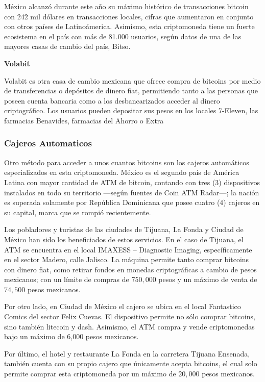 \documentclass[12pt,letterpaper]{article}
\begin{document}
M\'exico alcanz\'o durante este año su m\'aximo hist\'orico de transacciones bitcoin con 242 mil d\'olares en transacciones locales, cifras que aumentaron en conjunto con otros pa\'ises de Latino\'america. Asimismo, esta criptomoneda tiene un fuerte ecosistema en el pa\'is con m\'as de 81.000 usuarios, seg\'un datos de una de las mayores casas de cambio del pa\'is, Bitso.

\textbf{Volabit}

Volabit es otra casa de cambio mexicana que ofrece compra de bitcoins por medio de transferencias o dep\'ositos de dinero fiat, permitiendo tanto a las personas que poseen cuenta bancaria como a los desbancarizados acceder al dinero criptogr\'afico. Los usuarios pueden depositar sus pesos en los locales 7-Eleven, las farmacias Benavides, farmacias del Ahorro o Extra
\subsubsection*{Cajeros Automaticos}
Otro m\'etodo para acceder a unos cuantos bitcoins son los cajeros autom\'aticos especializados en esta criptomoneda. M\'exico es el segundo pa\'is de Am\'erica Latina con mayor cantidad de ATM de bitcoin, contando con tres (3) dispositivos instalados en todo su territorio —seg\'un fuentes de Coin ATM Radar—; la naci\'on es superada solamente por Rep\'ublica Dominicana que posee cuatro (4) cajeros en su capital, marca que se rompi\'o recientemente.

Los pobladores y turistas de las ciudades de Tijuana, La Fonda y Ciudad de M\'exico han sido los beneficiados de estos servicios. En el caso de Tijuana, el ATM se encuentra en el local IMAXESS – Diagnostic Imaging, espec\'ificamente en el sector Madero, calle Jalisco. La m\'aquina permite tanto comprar bitcoins con dinero fiat, como retirar fondos en monedas criptogr\'aficas a cambio de pesos mexicanos; con un l\'imite de compras de $750,000$ pesos y un m\'aximo de venta de $74,500$ pesos mexicanos.

Por otro lado, en Ciudad de M\'exico el cajero se ubica en el local Fantastico Comics del sector Felix Cuevas. El dispositivo permite no s\'olo comprar bitcoins, sino tambi\'en litecoin y dash. Asimismo, el ATM compra y vende criptomonedas bajo un m\'aximo de 6,000 pesos mexicanos.

Por \'ultimo, el hotel y restaurante La Fonda en la carretera Tijuana Ensenada, tambi\'en cuenta con su propio cajero que \'unicamente acepta bitcoins, el cual solo permite comprar esta criptomoneda por un m\'aximo de $20,000$ pesos mexicanos.
\end{document}
